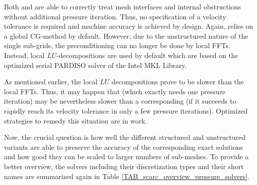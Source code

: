 Both \uglmat{} and \uscarc{} are able to correctly treat mesh interfaces and internal obstructions without additional pressure iteration. Thus, no specification of a velocity tolerance is required and machine accuracy is achieved by design.
Again, \uscarc{} relies on a global CG-method by default. However, due to the unstructured nature of the single sub-grids, the preconditioning can no longer be done by local FFTs. Instead, local $LU$-decompositions are used by default which are based on the optimized serial {\ct PARDISO} solver of the Intel\textsuperscript{\textregistered} MKL Library. 

As mentioned earlier, the local $LU$ decompositions prove to be slower than the local FFTs. Thus,
it may happen that \uscarc{} (which exactly needs one pressure iteration) may be nevertheless slower than a corresponding \scarc{} (if it succeeds to rapidly reach its velocity tolerance in only a few pressure iterations). Optimized strategies to remedy this situation are in work.

\vspace{0.3in}
Now, the crucial question is how well the different structured and unstructured variants are able to preserve the accuracy of the corresponding exact solutions and how good they can be scaled to larger numbers of sub-meshes. To provide a better overview, the solvers including their discretization types and their short names are summarized again in Table \ref{TAB_scarc_overview_pressure_solvers}. 


